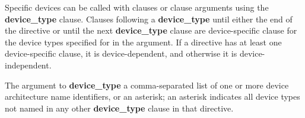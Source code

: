 Specific devices can be called with clauses or clause arguments using the \textbf{device\_type} clause. Clauses following a \textbf{device\_type} until either the end of the directive or until the next \textbf{device\_type} clause are device-specific clause for the device types specified for in the argument. If a directive has at least one device-specific clause, it is device-dependent, and otherwise it is device-independent.  

The argument to \textbf{device\_type} a comma-separated list of one or more device architecture name identifiers, or an asterisk; an asterisk indicates all device types not named in any other \textbf{device\_type} clause in that directive. 